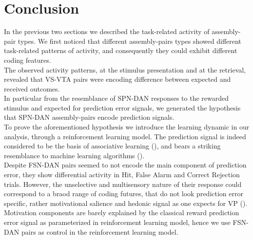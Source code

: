 \section{Conclusion}
In the previous two sections we described the task-related activity of assembly-pair types. We first noticed that different assembly-pairs types showed different task-related patterns of activity, and consequently they could exhibit different coding features.\\The observed activity patterns, at the stimulus presentation and at the retrieval, revealed that VS-VTA pairs were encoding difference between expected and received outcomes.\\ 
In particular from the resemblance of SPN-DAN responses to the rewarded stimulus and expected for prediction error signals, we generated the hypothesis that SPN-DAN assembly-pairs encode prediction signals.\\To prove the aforementioned hypothesis we introduce the learning dynamic in our analysis, through a reinforcement learning model. The prediction signal is indeed considered to be the basis of associative learning (\cite{RescorlaWagner}), and bears a striking resemblance to machine learning algorithms (\cite{SuttonBarto}).\\Despite FSN-DAN pairs seemed to not encode the main component of prediction error, they show differential activity in Hit, False Alarm and Correct Rejection trials. However, the unselective and multisensory nature of their response could correspond to a braod range of coding futures, that do not look prediction error specific, rather motivational salience and hedonic signal as one expects for VP (\cite{Root}).\\ Motivation components are barely explained by the classical reward prediction error signal as parameterized in reinforcement learning model, hence we use FSN-DAN pairs as control in the reinforcement learning model.

